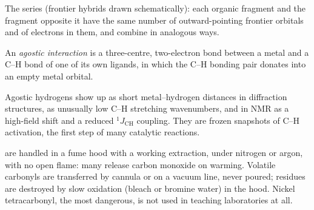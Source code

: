 \begin{omfigure}

{\small The  series (frontier hybrids drawn schematically): each organic
fragment and the  fragment opposite it have the same number of
outward-pointing frontier orbitals and of electrons in them, and combine in
analogous ways.}
\end{omfigure}

\begin{definition}\label{def:b3:organometallic-bonding:agostic}
An \emph{agostic interaction} is a three-centre,
two-electron bond between a metal and a C--H bond of one of its own ligands, in
which the C--H bonding pair donates into an empty metal orbital.
\end{definition}

Agostic hydrogens show up as short metal--hydrogen distances in diffraction
structures, as unusually low C--H stretching wavenumbers, and in NMR as a
high-field shift and a reduced $^1J_{\mathrm{CH}}$ coupling. They are frozen snapshots of
C--H activation, the first step of many catalytic reactions.

\begin{inthelab}
 are handled in a fume hood with a working extraction, under
nitrogen or argon, with no open flame: many release carbon monoxide on
warming. Volatile carbonyls are transferred by cannula or on a vacuum line, never
poured; residues are destroyed by slow oxidation (bleach or bromine water) in the
hood. Nickel tetracarbonyl, the most dangerous, is not used in teaching
laboratories at all.
\end{inthelab}

